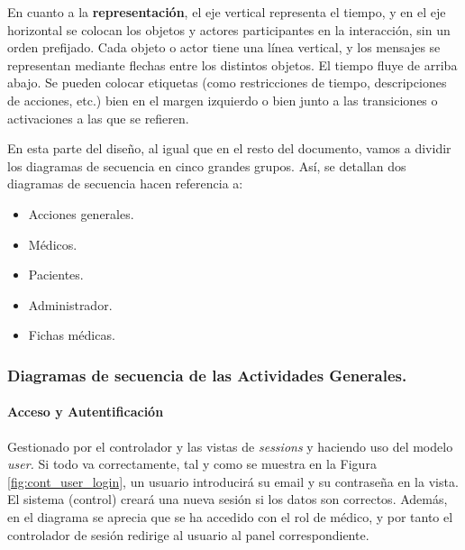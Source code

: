
			\medskip

			En cuanto a la \textbf{representación}, el eje vertical representa el tiempo, y en el eje horizontal se colocan los objetos y actores participantes en la interacción, sin un orden prefijado. Cada objeto o actor tiene una línea vertical, y los mensajes se representan mediante flechas entre los distintos objetos. El tiempo fluye de arriba abajo. Se pueden colocar etiquetas (como restricciones de tiempo, descripciones de acciones, etc.) bien en el margen izquierdo o bien junto a las transiciones o activaciones a las que se refieren. 

			En esta parte del diseño, al igual que en el resto del documento, vamos a dividir los diagramas de secuencia en cinco grandes grupos. Así, se detallan dos diagramas de secuencia hacen referencia a:
			\begin{itemize}
				\item Acciones generales.
				\item Médicos.
				\item Pacientes.
				\item Administrador.
				\item Fichas médicas.
			\end{itemize}
			

			\subsubsection{Diagramas de secuencia de las Actividades Generales.} %
			\label{par:diagramas_de_secuencia_de_las_actividades_generales_}
			
				\paragraph{Acceso y Autentificación} %
				\label{subp:cont_acceso_y_autentificacion}
				
					Gestionado por el controlador y las vistas de \textit{sessions} y haciendo uso del modelo \textit{user.}
					Si todo va correctamente, tal y como se muestra en la Figura \ref{fig:cont_user_login}, un usuario introducirá su email y su contraseña en la vista. El sistema (control) creará una nueva sesión si los datos son correctos. Además, en el diagrama se aprecia que se ha accedido con el rol de médico, y por tanto el controlador de sesión redirige al usuario al panel correspondiente.
					
